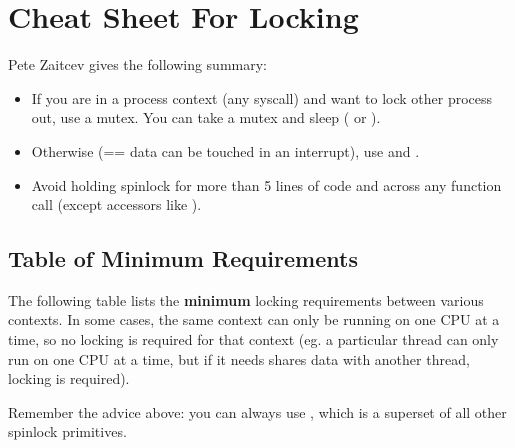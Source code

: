 \documentclass[a4paper,8pt,english]{sphinxmanual}
\begin{document}
\section{Cheat Sheet For Locking}
\label{kernel-hacking/locking:cheat-sheet-for-locking}
Pete Zaitcev gives the following summary:
\begin{itemize}
\item {} 
If you are in a process context (any syscall) and want to lock other
process out, use a mutex. You can take a mutex and sleep
( or ).

\item {} 
Otherwise (== data can be touched in an interrupt), use
 and
.

\item {} 
Avoid holding spinlock for more than 5 lines of code and across any
function call (except accessors like ).

\end{itemize}


\subsection{Table of Minimum Requirements}
\label{kernel-hacking/locking:table-of-minimum-requirements}
The following table lists the \textbf{minimum} locking requirements between
various contexts. In some cases, the same context can only be running on
one CPU at a time, so no locking is required for that context (eg. a
particular thread can only run on one CPU at a time, but if it needs
shares data with another thread, locking is required).

Remember the advice above: you can always use
, which is a superset of all other
spinlock primitives.
\end{document}

